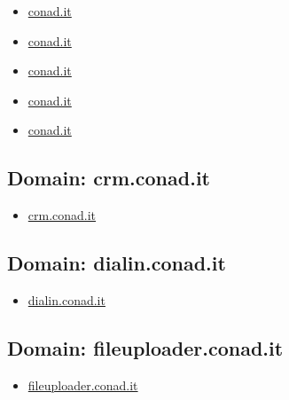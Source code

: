 \documentclass{article}
\begin{document}
\begin{itemize}
            \item \href{ https://dao.prepagataconad.it/}{ conad.it }
            
            \item \href{ https://mipremio.conad.it/}{ conad.it }
            
            \item \href{ https://www.conad.it/?utm\_source=crm\&utm\_medium=email\&utm\_content=124631197\&utm\_campaign=\_}{ conad.it }
            
            \item \href{ https://s1a.altuoservizio.conad.it/chiusuratemporanea.html}{ conad.it }
            
            \item \href{ https://insiemeperlascuola.conad.it/atpc/insiemeperlascuola/j/home}{ conad.it }
            
        
    \end{itemize}

    \subsection{Domain: crm.conad.it}
    \begin{itemize}
        
            
            \item \href{ http://crm.conad.it}{ crm.conad.it }
            
        
    \end{itemize}

    \subsection{Domain: dialin.conad.it}
    \begin{itemize}
        
            
            \item \href{ https://dialin.conad.it/}{ dialin.conad.it }
            
        
    \end{itemize}

    \subsection{Domain: fileuploader.conad.it}
    \begin{itemize}
        
            
            \item \href{ http://fileuploader.conad.it}{ fileuploader.conad.it }
            
        
    \end{itemize}
\end{document}
